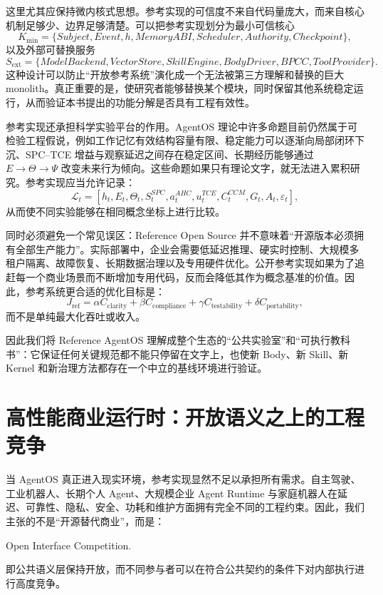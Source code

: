 这里尤其应保持微内核式思想。参考实现的可信度不来自代码量庞大，而来自核心机制足够少、边界足够清楚。可以把参考实现划分为最小可信核心
\[
K_{\min}
=
\{
Subject,
Event,
h,
MemoryABI,
Scheduler,
Authority,
Checkpoint
\},
\]
以及外部可替换服务
\[
S_{\mathrm{ext}}
=
\{
ModelBackend,
VectorStore,
SkillEngine,
BodyDriver,
BPCC,
ToolProvider
\}.
\]
这种设计可以防止``开放参考系统''演化成一个无法被第三方理解和替换的巨大 monolith。真正重要的是，使研究者能够替换某个模块，同时保留其他系统稳定运行，从而验证本书提出的功能分解是否具有工程有效性。

参考实现还承担科学实验平台的作用。AgentOS 理论中许多命题目前仍然属于可检验工程假说，例如工作记忆有效结构容量有限、稳定能力可以逐渐向局部闭环下沉、SPC--TCE 增益与观察延迟之间存在稳定区间、长期经历能够通过 $E\rightarrow\Theta\rightarrow\Psi$ 改变未来行为倾向。这些命题如果只有理论文字，就无法进入累积研究。参考实现应当允许记录：
\[
\mathcal L_t=
[
h_t,
E_t,
\Theta_t,
S^{SPC}_t,
a^{AHC}_t,
u^{TCE}_t,
C^{CCM}_t,
G_t,
A_t,
\varepsilon_t
],
\]
从而使不同实验能够在相同概念坐标上进行比较。

同时必须避免一个常见误区：Reference Open Source 并不意味着``开源版本必须拥有全部生产能力''。实际部署中，企业会需要低延迟推理、硬实时控制、大规模多租户隔离、故障恢复、长期数据治理以及专用硬件优化。公开参考实现如果为了追赶每一个商业场景而不断增加专用代码，反而会降低其作为概念基准的价值。因此，参考系统更合适的优化目标是：
\[
\boxed{
J_{\mathrm{ref}}
=
\alpha C_{\mathrm{clarity}}
+
\beta C_{\mathrm{compliance}}
+
\gamma C_{\mathrm{testability}}
+
\delta C_{\mathrm{portability}},
}
\]
而不是单纯最大化吞吐或收入。

因此我们将 Reference AgentOS 理解成整个生态的``公共实验室''和``可执行教科书''：它保证任何关键规范都不能只停留在文字上，也使新 Body、新 Skill、新 Kernel 和新治理方法都存在一个中立的基线环境进行验证。

\section{高性能商业运行时：开放语义之上的工程竞争}

当 AgentOS 真正进入现实环境，参考实现显然不足以承担所有需求。自主驾驶、工业机器人、长期个人 Agent、大规模企业 Agent Runtime 与家庭机器人在延迟、可靠性、隐私、安全、功耗和维护方面拥有完全不同的工程约束。因此，我们主张的不是``开源替代商业''，而是：
\begin{statementbox}
Open Interface Competition.
\end{statementbox}
即公共语义层保持开放，而不同参与者可以在符合公共契约的条件下对内部执行进行高度竞争。

